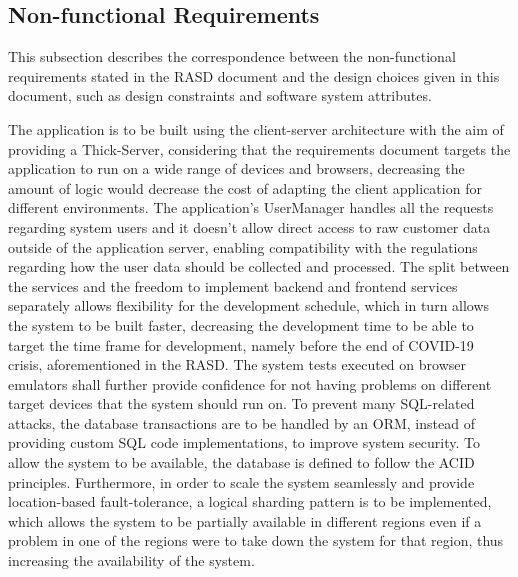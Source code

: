\subsection{Non-functional Requirements}

This subsection describes the correspondence between the non-functional requirements stated in the RASD document and the design choices given in this document, such as design constraints and software system attributes.

The application is to be built using the client-server architecture with the aim of providing a Thick-Server, considering that the requirements document targets the application to run on a wide range of devices and browsers, decreasing the amount of logic would decrease the cost of adapting the client application for different environments.
The application's UserManager handles all the requests regarding system users and it doesn't allow direct access to raw customer data outside of the application server, enabling compatibility with the regulations regarding how the user data should be collected and processed.
The split between the services and the freedom to implement backend and frontend services separately allows flexibility for the development schedule, which in turn allows the system to be built faster, decreasing the development time to be able to target the time frame for development, namely before the end of COVID-19 crisis, aforementioned in the RASD.
The system tests executed on browser emulators shall further provide confidence for not having problems on different target devices that the system should run on.
To prevent many SQL-related attacks, the database transactions are to be handled by an ORM, instead of providing custom SQL code implementations, to improve system security.
To allow the system to be available, the database is defined to follow the ACID principles.
Furthermore, in order to scale the system seamlessly and provide location-based fault-tolerance, a logical sharding pattern is to be implemented, which allows the system to be partially available in different regions even if a problem in one of the regions were to take down the system for that region, thus increasing the availability of the system.

